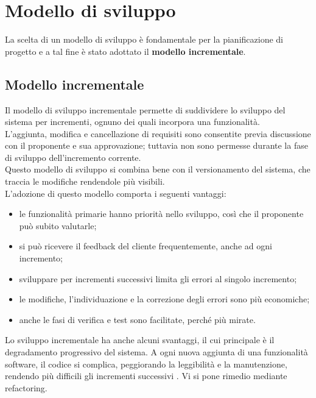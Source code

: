 \section{Modello di sviluppo}
La scelta di un modello di sviluppo è fondamentale per la pianificazione di 
progetto e a tal fine è stato adottato il \textbf{modello incrementale}.

\subsection{Modello incrementale}
Il modello di sviluppo incrementale permette di suddividere lo sviluppo del sistema per 
incrementi, ognuno dei quali incorpora una funzionalità. \\
L'aggiunta, modifica e cancellazione di requisiti sono consentite previa discussione con il proponente e sua 
approvazione; tuttavia non sono permesse durante la fase di sviluppo dell'incremento corrente.\\
Questo modello di sviluppo si combina bene con il versionamento del sistema, che traccia le modifiche rendendole più visibili.\\
L'adozione di questo modello comporta i seguenti vantaggi:
\begin{itemize}
	\item le funzionalità primarie hanno priorità nello sviluppo, così che il proponente può subito valutarle;
	\item si può ricevere il feedback del cliente frequentemente, anche ad ogni incremento;
	\item sviluppare per incrementi successivi limita gli errori al singolo incremento;
	\item le modifiche, l'individuazione e la correzione degli errori sono più economiche;
	\item anche le fasi di verifica e test sono facilitate, perché più mirate.
\end{itemize}
Lo sviluppo incrementale ha anche alcuni svantaggi, il cui principale è il degradamento progressivo del sistema. A ogni nuova aggiunta di una funzionalità software, il codice si complica, peggiorando la leggibilità e la manutenzione, rendendo più difficili gli incrementi successivi . Vi si pone rimedio mediante refactoring.

